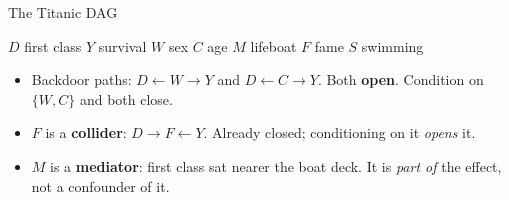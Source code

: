 \documentclass[
  11pt,
  ignorenonframetext,
  aspectratio=169,
]{beamer}
\providecommand{\tightlist}{%
  \setlength{\itemsep}{0pt}\setlength{\parskip}{0pt}}
\begin{document}
\begin{frame}{The Titanic DAG}
\protect{}\label{the-titanic-dag}
\begin{center}
\end{center}

\vspace{-0.3em}

\footnotesize

\(D\) first class \quad \(Y\) survival \quad \(W\) sex \quad \(C\) age
\quad \(M\) lifeboat \quad \(F\) fame \quad \(S\) swimming

\normalsize

\begin{itemize}
\tightlist
\item
  Backdoor paths: \(D \leftarrow W \rightarrow Y\) and
  \(D \leftarrow C \rightarrow Y\). Both \textbf{open}. Condition on
  \(\{W,C\}\) and both close.
\item
  \(F\) is a \textbf{collider}: \(D \rightarrow F \leftarrow Y\).
  Already closed; conditioning on it \emph{opens} it.
\item
  \(M\) is a \textbf{mediator}: first class sat nearer the boat deck. It
  is \emph{part of} the effect, not a confounder of it.
\end{itemize}
\end{frame}
\end{document}

